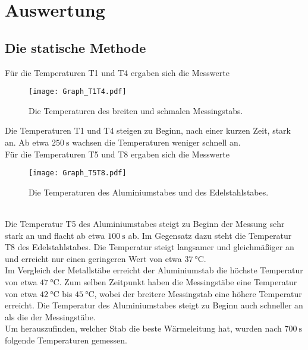 \section{Auswertung} \label{sec:auswertung}

\subsection{Die statische Methode}

    Für die Temperaturen T1 und T4 ergaben sich die Messwerte
    \begin{figure}
        \centering
        \texttt{[image: Graph\_T1T4.pdf]}
        \caption{Die Temperaturen des breiten und schmalen Messingstabs.}
        \label{fig:grapht1t4}
    \end{figure}

    Die Temperaturen T1 und T4 steigen zu Beginn, nach einer kurzen Zeit, stark an.
    Ab etwa $\SI{250}{\second}$ wachsen die Temperaturen weniger schnell an.\\
    
    Für die Temperaturen T5 und T8 ergaben sich die Messwerte 
    \begin{figure}
        \centering
        \texttt{[image: Graph\_T5T8.pdf]}
        \caption{Die Temperaturen des Aluminiumstabes und des Edelstahlstabes.}
        \label{fig:grapht5t8}
    \end{figure}\\

    Die Temperatur T5 des Aluminiumstabes steigt zu Beginn der Messung 
    sehr stark an und flacht ab etwa $\SI{100}{\second}$ ab.
    Im Gegensatz dazu steht die Temperatur T8 des Edelstahlstabes.
    Die Temperatur steigt langsamer und gleichmäßiger an und erreicht nur
    einen geringeren Wert von etwa $\SI{37}{\celsius}$.\\
    Im Vergleich der Metallstäbe erreicht der Aluminiumstab die höchste
    Temperatur von etwa $\SI{47}{\celsius}$. Zum selben Zeitpunkt haben
    die Messingstäbe eine Temperatur von etwa $\SI{42}{\celsius}$ bis $\SI{45}{\celsius}$,
    wobei der breitere Messingstab eine höhere Temperatur erreicht.
    Die Temperatur des Aluminiumstabes steigt zu Beginn auch schneller an als die
    der Messingstäbe.\\

    Um herauszufinden, welcher Stab die beste Wärmeleitung hat, wurden nach $\SI{700}{\second}$
    folgende Temperaturen gemessen.

